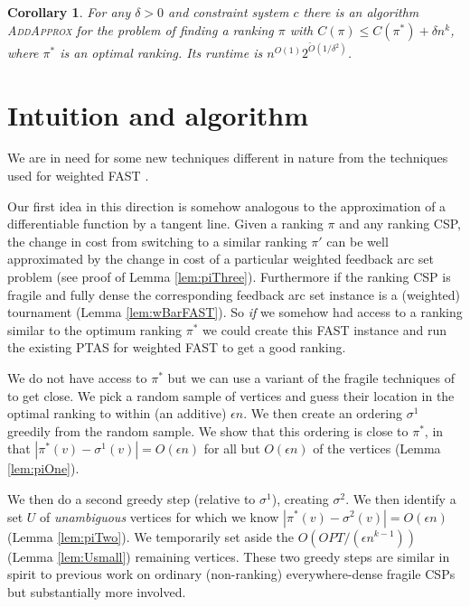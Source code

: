 \documentclass[dvips,11pt,letter]{article}
\newtheorem{corollary}[theorem]{Corollary}
\newcommand{\addApprox}{\textsc{AddApprox}}
\newcommand{\fast}{\textsc{FAST}}
\begin{document}
\begin{corollary}\label{thm:addApproxRank}
For any $\delta > 0$ and constraint system $c$ there is an algorithm \addApprox{} for the problem of finding a ranking $\pi$ with $C(\pi) \le C(\pi^*) + \delta n^k$, where $\pi^*$ is an optimal ranking. Its runtime is $n^{O(1)} 2^{\tilde O(1/\delta^2)}$.
\end{corollary}

\section{Intuition and algorithm}\label{sec:algo}

We are in need for some new techniques different in nature from the techniques used for weighted FAST \cite{mathieu09fast}.

Our first idea in this direction is somehow analogous to the approximation of a differentiable function by a tangent line. Given a ranking $\pi$ and any ranking CSP, the change in cost from switching to a similar ranking $\pi'$ can be well approximated by the change in cost of a particular weighted feedback arc set problem (see proof of Lemma \ref{lem:piThree}). Furthermore if the ranking CSP is fragile and fully dense the corresponding feedback arc set instance is a (weighted) tournament (Lemma \ref{lem:wBarFAST}). So \emph{if} we somehow had access to a ranking similar to the optimum ranking $\pi^*$ we could create this FAST instance and run the existing PTAS for weighted \fast{} \cite{mathieu09fast} to get a good ranking.

We do not have access to $\pi^*$ but we can use a variant of the fragile techniques of \cite{KS09} to get close. We pick a random sample of vertices and guess their location in the optimal ranking to within (an additive) $\epsilon n$. We then create an ordering $\sigma^1$ greedily from the random sample.
We show that this ordering is close to $\pi^*$, in that $|\pi^*(v) - \sigma^1(v)| = O(\epsilon n)$ for all but $O(\epsilon n)$ of the vertices (Lemma \ref{lem:piOne}).

We then do a second greedy step (relative to $\sigma^1$), creating $\sigma^2$. We then identify a set $U$ of \emph{unambiguous} vertices for which we know $|\pi^*(v) - \sigma^2(v)| = O(\epsilon n)$ (Lemma \ref{lem:piTwo}). We temporarily set aside the $O(OPT/(\epsilon n^{k-1}))$ (Lemma \ref{lem:Usmall}) remaining vertices. These two greedy steps are similar in spirit to previous work on ordinary (non-ranking) everywhere-dense fragile CSPs \cite{KS09} but substantially more involved.
\end{document}
